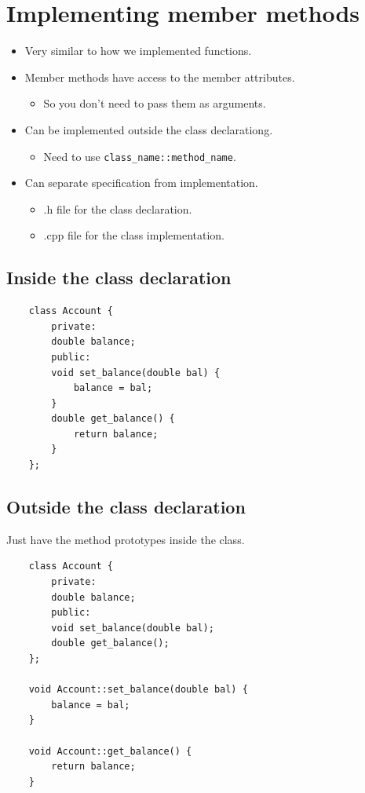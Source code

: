 \section{Implementing member methods}
\begin{itemize}
    \item Very similar to how we implemented functions.
    \item Member methods have access to the member attributes.
        \begin{itemize}
            \item So you don't need to pass them as arguments.
        \end{itemize}

    \item Can be implemented outside the class declarationg.
        \begin{itemize}
            \item Need to use \verb|class_name::method_name|.
        \end{itemize}
    
    \item Can separate specification from implementation.
        \begin{itemize}
            \item .h file for the class declaration.
            \item .cpp file for the class implementation.
        \end{itemize}
\end{itemize}

\subsection{Inside the class declaration}
\begin{verbatim}
    class Account {
        private:
        double balance;
        public:
        void set_balance(double bal) {
            balance = bal;
        }
        double get_balance() {
            return balance;
        }
    };
\end{verbatim}

\subsection{Outside the class declaration}
Just have the method prototypes inside the class.
\begin{verbatim}
    class Account {
        private:
        double balance;
        public:
        void set_balance(double bal);
        double get_balance();
    };

    void Account::set_balance(double bal) {
        balance = bal;
    }

    void Account::get_balance() {
        return balance;
    }
\end{verbatim}

